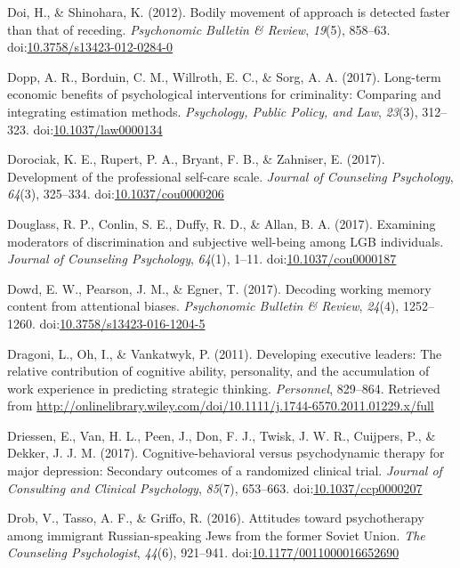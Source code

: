 \documentclass[english,man]{apa6}
\theoremstyle{definition}
\theoremstyle{definition}
\theoremstyle{definition}
\theoremstyle{remark}
\begin{document}
\hypertarget{ref-Doi2012}{}
Doi, H., \& Shinohara, K. (2012). Bodily movement of approach is
detected faster than that of receding. \emph{Psychonomic Bulletin \&
Review}, \emph{19}(5), 858--63.
doi:\href{https://doi.org/10.3758/s13423-012-0284-0}{10.3758/s13423-012-0284-0}

\hypertarget{ref-Dopp2017}{}
Dopp, A. R., Borduin, C. M., Willroth, E. C., \& Sorg, A. A. (2017).
Long-term economic benefits of psychological interventions for
criminality: Comparing and integrating estimation methods.
\emph{Psychology, Public Policy, and Law}, \emph{23}(3), 312--323.
doi:\href{https://doi.org/10.1037/law0000134}{10.1037/law0000134}

\hypertarget{ref-Dorociak2017}{}
Dorociak, K. E., Rupert, P. A., Bryant, F. B., \& Zahniser, E. (2017).
Development of the professional self-care scale. \emph{Journal of
Counseling Psychology}, \emph{64}(3), 325--334.
doi:\href{https://doi.org/10.1037/cou0000206}{10.1037/cou0000206}

\hypertarget{ref-Douglass2017}{}
Douglass, R. P., Conlin, S. E., Duffy, R. D., \& Allan, B. A. (2017).
Examining moderators of discrimination and subjective well-being among
LGB individuals. \emph{Journal of Counseling Psychology}, \emph{64}(1),
1--11. doi:\href{https://doi.org/10.1037/cou0000187}{10.1037/cou0000187}

\hypertarget{ref-Dowd2017}{}
Dowd, E. W., Pearson, J. M., \& Egner, T. (2017). Decoding working
memory content from attentional biases. \emph{Psychonomic Bulletin \&
Review}, \emph{24}(4), 1252--1260.
doi:\href{https://doi.org/10.3758/s13423-016-1204-5}{10.3758/s13423-016-1204-5}

\hypertarget{ref-Dragoni2011}{}
Dragoni, L., Oh, I., \& Vankatwyk, P. (2011). Developing executive
leaders: The relative contribution of cognitive ability, personality,
and the accumulation of work experience in predicting strategic
thinking. \emph{Personnel}, 829--864. Retrieved from
\url{http://onlinelibrary.wiley.com/doi/10.1111/j.1744-6570.2011.01229.x/full}

\hypertarget{ref-Driessen2017}{}
Driessen, E., Van, H. L., Peen, J., Don, F. J., Twisk, J. W. R.,
Cuijpers, P., \& Dekker, J. J. M. (2017). Cognitive-behavioral versus
psychodynamic therapy for major depression: Secondary outcomes of a
randomized clinical trial. \emph{Journal of Consulting and Clinical
Psychology}, \emph{85}(7), 653--663.
doi:\href{https://doi.org/10.1037/ccp0000207}{10.1037/ccp0000207}

\hypertarget{ref-Drob2016}{}
Drob, V., Tasso, A. F., \& Griffo, R. (2016). Attitudes toward
psychotherapy among immigrant Russian-speaking Jews from the former
Soviet Union. \emph{The Counseling Psychologist}, \emph{44}(6),
921--941.
doi:\href{https://doi.org/10.1177/0011000016652690}{10.1177/0011000016652690}
\end{document}
